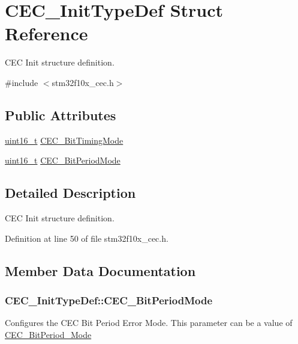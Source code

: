 \hypertarget{struct_c_e_c___init_type_def}{}\section{C\+E\+C\+\_\+\+Init\+Type\+Def Struct Reference}
\label{struct_c_e_c___init_type_def}


C\+EC Init structure definition.  




{\ttfamily \#include $<$stm32f10x\+\_\+cec.\+h$>$}

\subsection*{Public Attributes}
\begin{DoxyCompactItemize}
\item 
\hyperlink{_p_e___types_8h_a1f1825b69244eb3ad2c7165ddc99c956}{uint16\+\_\+t} \hyperlink{struct_c_e_c___init_type_def_a197bc5a8957ab0b86d4ecc1347fa9e37}{C\+E\+C\+\_\+\+Bit\+Timing\+Mode}
\item 
\hyperlink{_p_e___types_8h_a1f1825b69244eb3ad2c7165ddc99c956}{uint16\+\_\+t} \hyperlink{struct_c_e_c___init_type_def_a3cc27a2030d87a8bea17c6b0750dda2a}{C\+E\+C\+\_\+\+Bit\+Period\+Mode}
\end{DoxyCompactItemize}


\subsection{Detailed Description}
C\+EC Init structure definition. 

Definition at line 50 of file stm32f10x\+\_\+cec.\+h.



\subsection{Member Data Documentation}
\subsubsection[{\texorpdfstring{C\+E\+C\+\_\+\+Bit\+Period\+Mode}{CEC_BitPeriodMode}}]{ C\+E\+C\+\_\+\+Init\+Type\+Def\+::\+C\+E\+C\+\_\+\+Bit\+Period\+Mode}\hypertarget{struct_c_e_c___init_type_def_a3cc27a2030d87a8bea17c6b0750dda2a}{}\label{struct_c_e_c___init_type_def_a3cc27a2030d87a8bea17c6b0750dda2a}
Configures the C\+EC Bit Period Error Mode. This parameter can be a value of \hyperlink{group___c_e_c___bit_period___mode}{C\+E\+C\+\_\+\+Bit\+Period\+\_\+\+Mode} 

